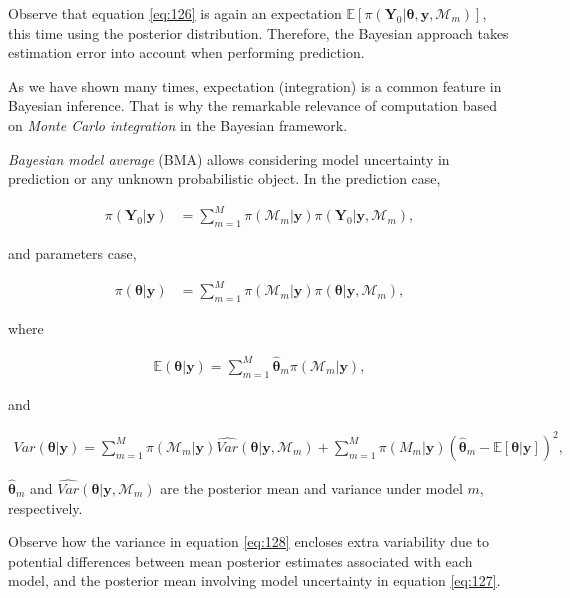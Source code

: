 Observe that equation \ref{eq:126} is again an expectation $\mathbb{E}[\pi(\mathbf{Y}_0|\mathbf{\theta},\mathbf{y},\mathcal{M}_m)]$, this time using the posterior distribution. Therefore,  the Bayesian approach takes estimation error into account when performing prediction. 

As we have shown many times, expectation (integration) is a common feature in Bayesian inference. That is why the remarkable relevance of computation based on \textit{Monte Carlo integration} in the Bayesian framework.  

\textit{Bayesian model average} (BMA) allows considering model uncertainty in prediction or any unknown probabilistic object. In the prediction case, 

\begin{align}
	\pi(\mathbf{Y}_0|\mathbf{y})&=\sum_{m=1}^M \pi(\mathcal{M}_m|\mathbf{y})\pi(\mathbf{Y}_0|\mathbf{y},\mathcal{M}_m),
\end{align}

and parameters case,

\begin{align}
	\pi(\mathbf{\theta}|\mathbf{y})&=\sum_{m=1}^M \pi(\mathcal{M}_m|\mathbf{y})\pi(\mathbf{\theta}|\mathbf{y},\mathcal{M}_m),
\end{align}

where 

\begin{align}
	\mathbb{E}(\mathbf{\theta}|\mathbf{y})=\sum_{m=1}^{M}\hat{\mathbf{\theta}}_m \pi(\mathcal{M}_m|\mathbf{y}),
	\label{eq:127}
\end{align}

and

\begin{align}
	Var(\mathbf{\theta}|\mathbf{y})= \sum_{m=1}^{M}\pi(\mathcal{M}_m|\mathbf{y}) \widehat{Var} (\mathbf{\theta}|\mathbf{y},\mathcal{M}_m)+\sum_{m=1}^{M} \pi(M_m|\mathbf{y}) (\hat{\mathbf{\theta}}_m-\mathbb{E}[\mathbf{\theta}|\mathbf{y}])^2,
	\label{eq:128}
\end{align}

$\hat{\mathbf{\theta}}_m$ and $\widehat{Var}(\mathbf{\theta}|\mathbf{y},\mathcal{M}_m)$ are the posterior mean and variance under model $m$, respectively.

Observe how the variance in equation \ref{eq:128} encloses extra variability due to potential differences between mean posterior estimates associated with each model, and the posterior mean involving model uncertainty in equation \ref{eq:127}.

